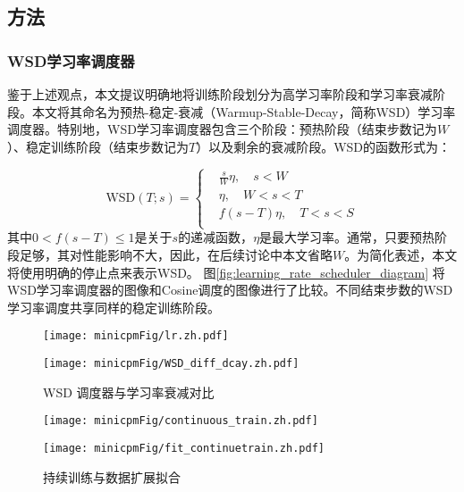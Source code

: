 \subsection{方法}
\subsubsection{WSD学习率调度器}
鉴于上述观点，本文提议明确地将训练阶段划分为高学习率阶段和学习率衰减阶段。本文将其命名为预热-稳定-衰减（Warmup-Stable-Decay，简称WSD）学习率调度器。特别地，WSD学习率调度器包含三个阶段：预热阶段（结束步数记为$W$）、稳定训练阶段（结束步数记为$T$）以及剩余的衰减阶段。WSD的函数形式为：

\begin{equation}
    \text{WSD}(T; s) = \begin{cases}
       & \frac{s}{W} \eta, \quad s<W\\
       & \eta, \quad W < s < T \\
       & f(s-T)\eta,\quad T < s < S\\
    \end{cases}
\end{equation}
其中$0 < f(s - T) \leq 1$是关于$s$的递减函数，$\eta$是最大学习率。通常，只要预热阶段足够，其对性能影响不大，因此，在后续讨论中本文省略$W$。为简化表述，本文将使用明确的停止点来表示WSD。 图\ref{fig:learning_rate_scheduler_diagram} 将WSD学习率调度器的图像和Cosine调度的图像进行了比较。不同结束步数的WSD学习率调度共享同样的稳定训练阶段。

\begin{figure}[htbp]
    \centering
    \begin{minipage}{0.48\linewidth}
        \centering
        \texttt{[image: minicpmFig/lr.zh.pdf]}
        \label{fig:learning_rate_scheduler_diagram}
    \end{minipage}
    \hfill
    \begin{minipage}{0.48\linewidth}
        \centering
        \texttt{[image: minicpmFig/WSD\_diff\_dcay.zh.pdf]}
        \label{fig:wsd_diff_dcay}
    \end{minipage}
    \caption{WSD 调度器与学习率衰减对比}
\end{figure}

\begin{figure}[htbp]
    \centering
    \begin{minipage}{0.48\linewidth}
        \centering
        \texttt{[image: minicpmFig/continuous\_train.zh.pdf]}
        \label{fig:continuoustrain}
    \end{minipage}
    \hfill
    \begin{minipage}{0.48\linewidth}
        \centering
        \texttt{[image: minicpmFig/fit\_continuetrain.zh.pdf]}
        \label{fig:fit_continue_train}
    \end{minipage}
    \caption{持续训练与数据扩展拟合}
\end{figure}



